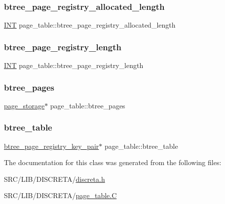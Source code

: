 \subsubsection{\texorpdfstring{btree\+\_\+page\+\_\+registry\+\_\+allocated\+\_\+length}{btree\_page\_registry\_allocated\_length}}
{\footnotesize\ttfamily \mbox{\hyperlink{galois_8h_a09fddde158a3a20bd2dcadb609de11dc}{I\+NT}} page\+\_\+table\+::btree\+\_\+page\+\_\+registry\+\_\+allocated\+\_\+length}

\mbox{\label{classpage__table_a75c9a6c8d93ee9551c5d37f2a65bd9b0}} 
\subsubsection{\texorpdfstring{btree\+\_\+page\+\_\+registry\+\_\+length}{btree\_page\_registry\_length}}
{\footnotesize\ttfamily \mbox{\hyperlink{galois_8h_a09fddde158a3a20bd2dcadb609de11dc}{I\+NT}} page\+\_\+table\+::btree\+\_\+page\+\_\+registry\+\_\+length}

\mbox{\label{classpage__table_a5dac3496822726daf67f5230c1f96390}} 
\subsubsection{\texorpdfstring{btree\+\_\+pages}{btree\_pages}}
{\footnotesize\ttfamily \mbox{\hyperlink{classpage__storage}{page\+\_\+storage}}$\ast$ page\+\_\+table\+::btree\+\_\+pages}

\mbox{\label{classpage__table_a00345ca4f7fa36673a5a839d186c6861}} 
\subsubsection{\texorpdfstring{btree\+\_\+table}{btree\_table}}
{\footnotesize\ttfamily \mbox{\hyperlink{structbtree__page__registry__key__pair}{btree\+\_\+page\+\_\+registry\+\_\+key\+\_\+pair}}$\ast$ page\+\_\+table\+::btree\+\_\+table}



The documentation for this class was generated from the following files\+:\begin{DoxyCompactItemize}
\item 
S\+R\+C/\+L\+I\+B/\+D\+I\+S\+C\+R\+E\+T\+A/\mbox{\hyperlink{discreta_8h}{discreta.\+h}}\item 
S\+R\+C/\+L\+I\+B/\+D\+I\+S\+C\+R\+E\+T\+A/\mbox{\hyperlink{page__table_8_c}{page\+\_\+table.\+C}}\end{DoxyCompactItemize}
